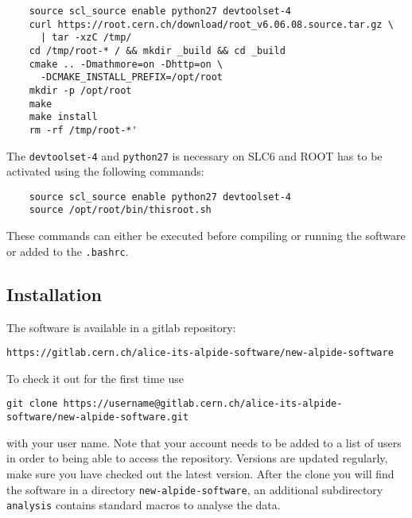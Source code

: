 \documentclass{article}
\begin{document}
\begin{itemize}
\begin{lstlisting}
    source scl_source enable python27 devtoolset-4
    curl https://root.cern.ch/download/root_v6.06.08.source.tar.gz \
      | tar -xzC /tmp/
    cd /tmp/root-* / && mkdir _build && cd _build
    cmake .. -Dmathmore=on -Dhttp=on \
      -DCMAKE_INSTALL_PREFIX=/opt/root
    mkdir -p /opt/root
    make
    make install
    rm -rf /tmp/root-*'
  \end{lstlisting}
  The \texttt{devtoolset-4} and \texttt{python27} is necessary on SLC6 and ROOT has to be activated using the following commands:
  \begin{lstlisting}
    source scl_source enable python27 devtoolset-4
    source /opt/root/bin/thisroot.sh
  \end{lstlisting}
  These commands can either be executed before compiling or running the software or added to the \texttt{.bashrc}.
\end{itemize}

\subsection{Installation}
The software is available in a gitlab repository:

\begin{lstlisting}
https://gitlab.cern.ch/alice-its-alpide-software/new-alpide-software
\end{lstlisting}

To check it out for the first time use

\begin{lstlisting}
git clone https://username@gitlab.cern.ch/alice-its-alpide-software/new-alpide-software.git
\end{lstlisting}

with your user name. Note that your account needs to be added to a
list of users in order to being able to access the repository.
Versions are updated regularly, make sure you have checked out the
latest version. After the clone you will find the software in a directory \texttt{new-alpide-software}, an additional subdirectory \texttt{analysis} contains standard macros to analyse the data.
\end{document}
